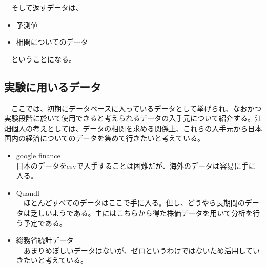 \documentclass{scrartcl}
\begin{document}
　そして返すデータは、\\
\begin{itemize}
\item 予測値\\
\item 相関についてのデータ\\
\end{itemize}

　ということになる。\\

\subsection{実験に用いるデータ}
\label{sec:orgcfaae24}
　ここでは、初期にデータベースに入っているデータとして挙げられ、なおかつ実験段階に於いて使用できると考えられるデータの入手元について紹介する。江畑個人の考えとしては、データの相関を求める関係上、これらの入手元から日本国内の経済についてのデータを集めて行きたいと考えている。\\
\begin{itemize}
\item google finance\\
日本のデータをcsvで入手することは困難だが、海外のデータは容易に手に入る。\\
\item Quandl\\
　ほとんどすべてのデータはここで手に入る。但し、どうやら長期間のデータは乏しいようである。主にはこちらから得た株価データを用いて分析を行う予定である。\\
\item 総務省統計データ\\
　あまりめぼしいデータはないが、ゼロというわけではないため活用していきたいと考えている。\\
\end{itemize}
\end{document}
